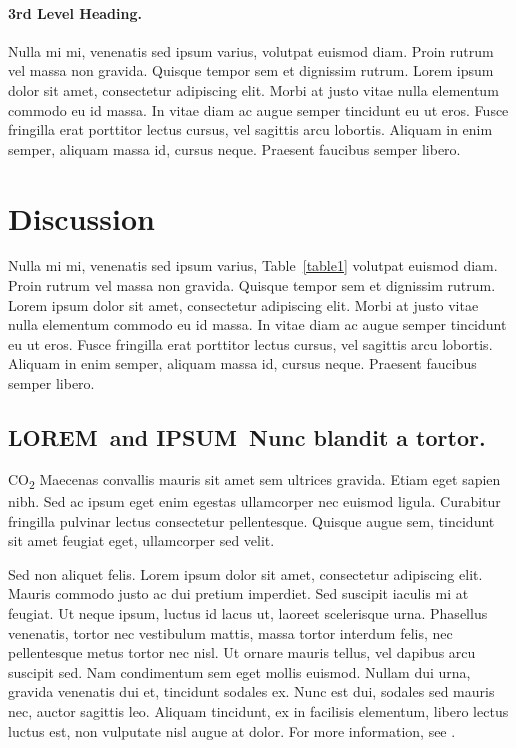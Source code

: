 \documentclass[10pt,letterpaper]{article}
\newcommand{\lorem}{{\bf LOREM}}
\newcommand{\ipsum}{{\bf IPSUM}}
\begin{document}
\paragraph{3rd Level Heading.} Nulla mi mi, venenatis sed ipsum varius, volutpat euismod diam. Proin rutrum vel massa non gravida. Quisque tempor sem et dignissim rutrum. Lorem ipsum dolor sit amet, consectetur adipiscing elit. Morbi at justo vitae nulla elementum commodo eu id massa. In vitae diam ac augue semper tincidunt eu ut eros. Fusce fringilla erat porttitor lectus cursus, vel sagittis arcu lobortis. Aliquam in enim semper, aliquam massa id, cursus neque. Praesent faucibus semper libero.

\newpage
\section*{Discussion}
Nulla mi mi, venenatis sed ipsum varius, Table~\ref{table1} volutpat euismod diam. Proin rutrum vel massa non gravida. Quisque tempor sem et dignissim rutrum. Lorem ipsum dolor sit amet, consectetur adipiscing elit. Morbi at justo vitae nulla elementum commodo eu id massa. In vitae diam ac augue semper tincidunt eu ut eros. Fusce fringilla erat porttitor lectus cursus, vel sagittis arcu lobortis. Aliquam in enim semper, aliquam massa id, cursus neque. Praesent faucibus semper libero.

\subsection*{\lorem\ and \ipsum\ Nunc blandit a tortor.}

CO\textsubscript{2} Maecenas convallis mauris sit amet sem ultrices gravida. Etiam eget sapien nibh. Sed ac ipsum eget enim egestas ullamcorper nec euismod ligula. Curabitur fringilla pulvinar lectus consectetur pellentesque. Quisque augue sem, tincidunt sit amet feugiat eget, ullamcorper sed velit. 

Sed non aliquet felis. Lorem ipsum dolor sit amet, consectetur adipiscing elit. Mauris commodo justo ac dui pretium imperdiet. Sed suscipit iaculis mi at feugiat. Ut neque ipsum, luctus id lacus ut, laoreet scelerisque urna. Phasellus venenatis, tortor nec vestibulum mattis, massa tortor interdum felis, nec pellentesque metus tortor nec nisl. Ut ornare mauris tellus, vel dapibus arcu suscipit sed. Nam condimentum sem eget mollis euismod. Nullam dui urna, gravida venenatis dui et, tincidunt sodales ex. Nunc est dui, sodales sed mauris nec, auctor sagittis leo. Aliquam tincidunt, ex in facilisis elementum, libero lectus luctus est, non vulputate nisl augue at dolor. For more information, see .
\end{document}
